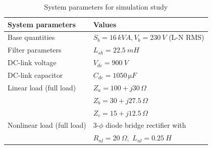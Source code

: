 \begin{table}[] 
	\centering
	\caption{System parameters for simulation study}
	\label{Table4.2}
	\begin{tabular}{>{\small}l>{\small}l}  
		\hline
		\hline
		\textbf{\footnotesize System parameters} & \textbf{\footnotesize Values}\\
		\hline
		\footnotesize Base quantities & \footnotesize$S_{b} = 16\, \si{kVA}, V_{b} = 230 ~\si{V}$ (L-N RMS)  \\
		\footnotesize Filter parameters & \footnotesize $L_{sh} = 22.5 ~\si{mH}$ \\ 
		\footnotesize DC-link voltage & \footnotesize $V_{dc} = 900 ~\si{V}$ \\
		\footnotesize DC-link capacitor & \footnotesize $C_{dc} = 1050 \, \si{\micro F	}$ \\
		\footnotesize Linear load (full load)  &  \footnotesize $Z_{a} = 100+j30\,\si{\Omega}$ \\ & \footnotesize $Z_{b} = 30+j27.5\, \si{\Omega}$ \\  & \footnotesize $Z_{c} = 15+j12.5\, \si{\Omega}$ \\
		\footnotesize Nonlinear load (full load)  &  \footnotesize $3$-$\phi$ diode bridge rectifier with \\ & \footnotesize $R_{nl} = 20  ~\Omega$,\, $L_{nl} = 0.25 ~\si{H}$ \\ 
		\hline
		\hline 
	\end{tabular} 
\end{table} 

